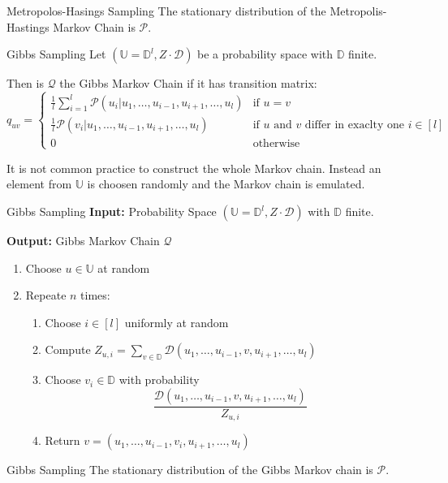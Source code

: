 \documentclass[english]{panikzettel}
\begin{document}
\begin{theo}{Metropolos-Hasings Sampling}
The stationary distribution of the Metropolis-Hastings Markov Chain is $\mathcal{P}$.
\end{theo}

\begin{defi}{Gibbs Sampling}
Let $(\mathbb{U} = \mathbb{D}^l, Z \cdot \mathcal{D})$ be a probability space with $\mathbb{D}$ finite.

Then is $\mathcal{Q}$ the Gibbs Markov Chain if it has transition matrix:
$$
q_{uv} =
\begin{cases}
\frac{1}{l} \sum_{i=1}^l \mathcal{P}(u_i| u_1, \ldots, u_{i-1}, u_{i+1}, \ldots, u_l) & \text{if } u = v \\
\frac{1}{l} \mathcal{P}(v_i| u_1, \ldots, u_{i-1}, u_{i+1}, \ldots, u_l) & \text{if $u$ and $v$ differ in exaclty one } i \in [l] \\
0 & \text{otherwise}
\end{cases}
$$
\end{defi}

It is not common practice to construct the whole Markov chain. Instead an element from $\mathbb{U}$ is choosen randomly and the Markov chain is emulated.

\begin{algo}{Gibbs Sampling}
\textbf{Input:} Probability Space $(\mathbb{U} = \mathbb{D}^l, Z \cdot \mathcal{D})$ with $\mathbb{D}$ finite.

\textbf{Output:} Gibbs Markov Chain $\mathcal{Q}$
\tcblower
\begin{enumerate}
\item Choose $u \in \mathbb{U}$ at random
\item Repeate $n$ times:
\begin{enumerate}
    \item Choose $i \in [l]$ uniformly at random
    \item Compute $Z_{u,i} = \sum_{v \in \mathbb{D}} \mathcal{D}(u_1, \ldots, u_{i-1}, v, u_{i+1}, \ldots, u_l)$
    \item Choose $v_i \in \mathbb{D}$ with probability
$$
\frac{\mathcal{D}(u_1, \ldots, u_{i-1}, v, u_{i+1}, \ldots, u_l)}{Z_{u,i}}
$$
    \item Return $v = (u_1, \ldots, u_{i-1}, v_i, u_{i+1}, \ldots, u_l)$
\end{enumerate}
\end{enumerate}
\end{algo}

\begin{theo}{Gibbs Sampling}
The stationary distribution of the Gibbs Markov chain is $\mathcal{P}$.
\end{theo}
\end{document}
